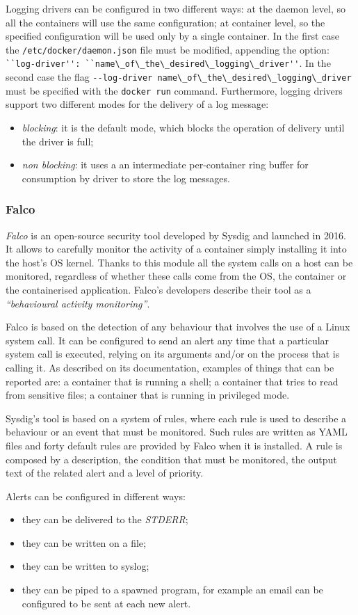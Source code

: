 \documentclass[a4paper,12pt]{article}
\newcommand{\file}[1]{\texttt{#1}\xspace}
\newcommand{\code}[1]{\lstinline|#1|}
\begin{document}
Logging drivers can be configured in two different ways: at the daemon level, so
all the containers will use the same configuration; at container level, so the
specified configuration will be used only by a single container. In the first
case the \file{/etc/docker/daemon.json} file must be modified, appending the
option: \code{``log-driver'': ``name\_of\_the\_desired\_logging\_driver''}. In
the second case the flag \code{--log-driver
name\_of\_the\_desired\_logging\_driver} must be specified with the \code{docker
run} command. Furthermore, logging drivers support two different modes for the
delivery of a log message:
\begin{itemize} 
  \item \textit{blocking}: it is the default mode, which blocks the operation of
  delivery until the driver is full;
  \item \textit{non blocking}: it uses a an intermediate per-container ring
  buffer for consumption by driver to store the log messages.
\end{itemize}

\subsubsection{Falco}
 
\textit{Falco} \cite{sysdig_falco} is an open-source security tool developed by
Sysdig and launched in 2016. It allows to carefully monitor the activity of a
container simply installing it into the host's OS kernel. Thanks to this module
all the system calls on a host can be monitored, regardless of whether these
calls come from the OS, the container or the containerised application. Falco's
developers describe their tool as a \textit{``behavioural activity monitoring''}.
\par Falco is based on the detection of any behaviour that involves the use of a
Linux system call. It can be configured to send an alert any time that a
particular system call is executed, relying on its arguments and/or on the
process that is calling it. As described on its documentation, examples of
things that can be reported are: a container that is running a shell; a
container that tries to read from sensitive files; a container that is running
in privileged mode. \par Sysdig's tool is based on a system of rules, where
each rule is used to describe a behaviour or an event that must be monitored.
Such rules are written as YAML files and forty default rules are provided by
Falco when it is installed. A rule is composed by a description, the condition
that must be monitored, the output text of the related alert and a level of
priority. \par Alerts can be configured in different ways:
\begin{itemize}
  \item they can be delivered to the \textit{STDERR};
  \item they can be written on a file;
  \item they can be written to syslog;
  \item they can be piped to a spawned program, for example an email can be
  configured to be sent at each new alert.
\end{itemize}
\end{document}
